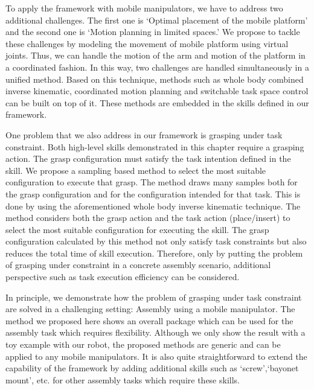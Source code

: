 To apply the framework with mobile manipulators, we have to address two additional challenges. The first one is `Optimal placement of the mobile platform' and the second one is `Motion planning in limited spaces.' We propose to tackle these challenges by modeling the movement of mobile platform using virtual joints. Thus, we can handle the motion of the arm and motion of the platform in a coordinated fashion. In this way, two challenges are handled simultaneously in a unified method. Based on this technique, methods such as whole body combined inverse kinematic,  coordinated motion planning and switchable task space control can be built on top of it. These methods are embedded in the skills defined in our framework. 

One problem that we also address in our framework is grasping under task constraint. Both high-level skills demonstrated in this chapter require a grasping action. The grasp configuration must satisfy the task intention defined in the skill. We propose a sampling based method to select the most suitable configuration to execute that grasp. The method draws many samples both for the grasp configuration and for the configuration intended for that task. This is done by using the aforementioned whole body inverse kinematic technique. The method considers both the grasp action and the task action (place/insert) to select the most suitable configuration for executing the skill. The grasp configuration calculated by this method not only satisfy task constraints but also reduces the total time of  skill execution. Therefore, only by putting the problem of grasping under constraint in a concrete assembly scenario, additional perspective such as task execution efficiency can be considered.  

In principle, we demonstrate how the problem of grasping under task constraint are solved in a challenging setting: Assembly using a mobile manipulator. The method we proposed here shows an overall package which can be used for the assembly task which requires flexibility. Although we only show the result with a toy example with our robot, the proposed methods are generic and can be applied to any mobile manipulators. It is also quite straightforward to extend the capability of the framework by adding additional skills such as `screw',`bayonet mount', etc. for other assembly tasks which require these skills.  


 


